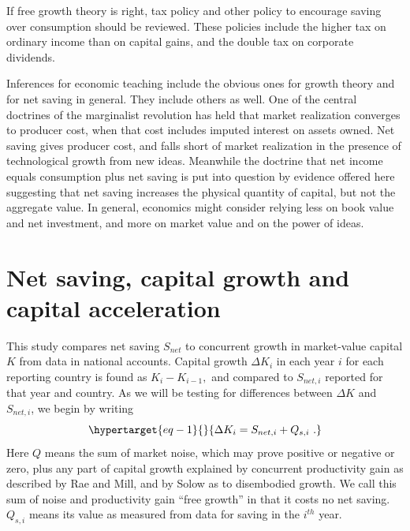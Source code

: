 If free growth theory is right, tax policy and other policy to encourage
saving over consumption should be reviewed. These policies
include the higher tax on ordinary income than on capital gains, and the
double tax on corporate dividends.

Inferences for economic teaching include the obvious ones for growth
theory and for net saving in general. They include others as well.
One of the central doctrines of the marginalist revolution has held that
market realization converges to producer cost, when that cost includes
imputed interest on assets owned. Net saving gives producer cost,
and falls short of market realization in the presence of technological
growth from new ideas. Meanwhile the doctrine that net income equals
consumption plus net saving is put into question by evidence offered
here suggesting that net saving increases the physical quantity of
capital, but not the aggregate value. In general, economics might
consider relying less on book value and net investment, and more on market value and on the
power of ideas.

\hypertarget{net-saving-and-capital-growth}{%
\section{Net saving, capital growth and capital acceleration}\label{net-saving-and-capital-growth}}

This study compares net saving \(S_{net}\) to concurrent growth in
market-value capital \(K\) from data in national accounts. Capital
growth \({\Delta K}_{i}\) in each year \(i\) for each reporting country
is found as \(K_{i} - K_{i - 1},\) and compared to \(S_{net,i}\)
reported for that year and country. As we will be testing for
differences between \(\Delta K\) and \(S_{net,i}\), we begin by writing
%
\begin{equation}\protect\hypertarget{eq-1}{}{\Delta K_{i} =S_{net,i} + Q_{s,i}\ .}\label{eq-1}\end{equation}
%
Here \(Q\) means the sum of market noise, which may prove
positive or negative or zero, plus any part of capital growth explained
by concurrent productivity gain as described by Rae and Mill, and by
Solow as to disembodied growth. We call this sum of noise and
productivity gain ``free growth'' in that it costs no net saving.
\(Q_{s,i}\) means its value as measured from data for saving in the \(i^{th}\) year.

